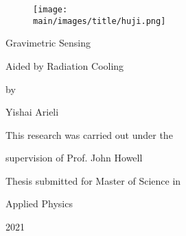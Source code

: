 \documentclass[\main/master.tex]{subfiles}
\begin{document}
\pagestyle{empty}
\begin{titlepage}
\begin{figure}[htbp]
	\centering
	\texttt{[image: \\main/images/title/huji.png]}
\end{figure}
\doublespacing
\begin{center}
  {\titlefont Gravimetric Sensing \par \vspace{10 mm}
   Aided by Radiation Cooling
   }
   \vspace{1in}
   
   by\par
   
   Yishai Arieli\par
   This research was carried out under the\par
   supervision of Prof. John Howell\par
   \vspace{1.5in}
   
   Thesis submitted for Master of Science in\par
   Applied Physics\par
   2021
   \end{center}
  \end{titlepage}
\end{document}
